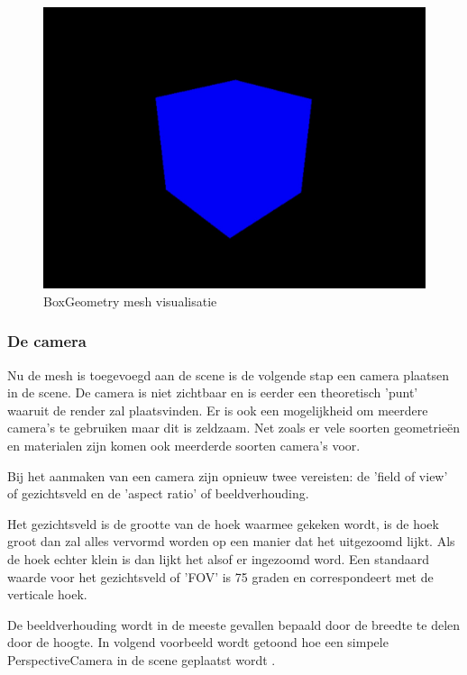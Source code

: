 \begin{figure}
\centering
\includegraphics[width=1\linewidth]{graphics/boxGeometry}
\caption[BoxGeometry mesh visualisatie]{BoxGeometry mesh visualisatie}
\label{fig:boxGeometry}
\end{figure}

\newpage
\subsubsection{De camera}

Nu de mesh is toegevoegd aan de scene is de volgende stap een camera plaatsen in de scene. De camera is niet zichtbaar en is eerder een theoretisch 'punt' waaruit de render zal plaatsvinden. Er is ook een mogelijkheid om meerdere camera's te gebruiken maar dit is zeldzaam. Net zoals er vele soorten geometrieën en materialen zijn komen ook meerderde soorten camera's voor.

Bij het aanmaken van een camera zijn opnieuw twee vereisten: de 'field of view' of gezichtsveld en de 'aspect ratio' of beeldverhouding. 

Het gezichtsveld is de grootte van de hoek waarmee gekeken wordt, is de hoek groot dan zal alles vervormd worden op een manier dat het uitgezoomd lijkt. Als de hoek echter klein is dan lijkt het alsof er ingezoomd word. Een standaard waarde voor het gezichtsveld of 'FOV' is 75 graden en correspondeert met de verticale hoek.

De beeldverhouding wordt in de meeste gevallen bepaald door de breedte te delen door de hoogte. In volgend voorbeeld wordt getoond hoe een simpele PerspectiveCamera in de scene geplaatst wordt \autocite{Simon2023}.

